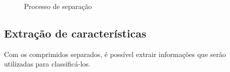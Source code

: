 \begin{figure}[H]
        
        \caption{Processo de separação}
        \label{fig:proCond}
\end{figure}

\subsection{Extração de características}

Com os comprimidos separados, é possível extrair informações que serão utilizadas para classificá-los.

